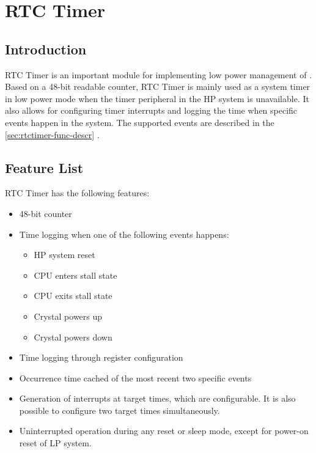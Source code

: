 \documentclass[main\_\_EN.tex]{subfiles}
\begin{document}

\ifglobal
\else
    {\let\clearpage\relax \listoftodos}
    {\let\clearpage\relax \listofdonetodos}
    \tableofcontents
\fi



\hypertarget{rtctimer}{}
\chapter{RTC Timer}
\label{mod:rtctimer}


\section{Introduction}

RTC Timer is an important module for implementing low power management of \chipname{}. Based on a 48-bit readable counter, RTC Timer is mainly used as a system timer in low power mode when the timer peripheral in the HP system is unavailable. It also allows for configuring timer interrupts and logging the time when specific events happen in the system. The supported events are described in the \ref{sec:rtctimer-func-descr} .

\section{Feature List} \label{sec:rtctimer-features}

RTC Timer has the following features:


\begin{itemize}
    \item 48-bit counter
    \item Time logging when one of the following events happens:
    \begin{itemize}
        \item HP system reset
        \item CPU enters stall state
        \item CPU exits stall state
        \item Crystal powers up
        \item Crystal powers down
    \end{itemize}
    \item Time logging through register configuration
    \item Occurrence time cached of the most recent two specific events
    \item Generation of interrupts at target times, which are configurable. It is also possible to configure two target times simultaneously.
    \item Uninterrupted operation during any reset or sleep mode, except for power-on reset of LP system.
\end{itemize}
\end{document}
